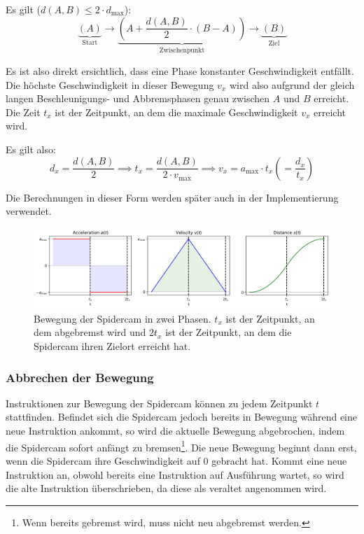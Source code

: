 Es gilt ($d(A, B) \leq 2 \cdot d_{\max} $):
\[
    \underbrace{(A)}_{\text{Start}} \rightarrow \underbrace{\left(A + \frac{d(A, B)}{2} \cdot (B - A)\right)}_{\text{Zwischenpunkt}} \rightarrow \underbrace{(B)}_{\text{Ziel}}
\]

Es ist also direkt ersichtlich, dass eine Phase konstanter Geschwindigkeit entfällt.
Die höchste Geschwindigkeit in dieser Bewegung $v_x$ wird also aufgrund der gleich langen Beschleunigungs- und Abbremsphasen genau zwischen $A$ und $B$ erreicht.
Die Zeit $t_x$ ist der Zeitpunkt, an dem die maximale Geschwindigkeit $v_{x}$ erreicht wird.

Es gilt also:
\[
    d_x = \frac{d(A, B)}{2} \implies t_x = \frac{d(A, B)}{2 \cdot v_{\max}} \implies v_x = a_{\max} \cdot t_x \left( = \frac{d_x}{t_x}\right)
\]


Die Berechnungen in dieser Form werden später auch in der Implementierung verwendet.

\begin{figure}[H]
    \centering
    \includegraphics[width=\textwidth]{figures/two_phases.png}
    \caption{Bewegung der Spidercam in zwei Phasen. $t_x$ ist der Zeitpunkt, an dem abgebremst wird und $2t_x$ ist der Zeitpunkt, an dem die Spidercam ihren Zielort erreicht hat.}
    \label{fig:two_phases}
\end{figure}

\subsubsection{Abbrechen der Bewegung}
Instruktionen zur Bewegung der Spidercam können zu jedem Zeitpunkt $t$ stattfinden.
Befindet sich die Spidercam jedoch bereits in Bewegung während eine neue Instruktion ankommt, so wird die aktuelle Bewegung abgebrochen, indem die Spidercam sofort anfängt zu bremsen\footnote{Wenn bereits gebremst wird, muss nicht neu abgebremst werden.}.
Die neue Bewegung beginnt dann erst, wenn die Spidercam ihre Geschwindigkeit auf 0 gebracht hat.
Kommt eine neue Instruktion an, obwohl bereits eine Instruktion auf Ausführung wartet, so wird die alte Instruktion überschrieben, da diese als veraltet angenommen wird.



